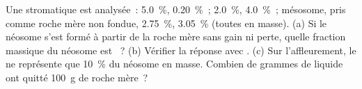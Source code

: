 \begin{exercise}[$\star\star\star$]\label{exo:b2:crustal-melting:12}
Une  stromatique est analysée~:   \qty{5.0}{\percent}, 
\qty{0.20}{\percent}~;   \qty{2.0}{\percent}, 
\qty{4.0}{\percent}~; mésosome, pris comme roche mère non fondue, 
\qty{2.75}{\percent},  \qty{3.05}{\percent} (toutes en masse). (a) Si le
néosome s'est formé à partir de la roche mère sans gain ni perte, quelle fraction massique du néosome est
~? (b) Vérifier la réponse avec . (c) Sur l'affleurement, le  ne représente que
\qty{10}{\percent} du néosome en masse. Combien de grammes de liquide ont quitté
\qty{100}{\gram} de roche mère~?
\end{exercise}

